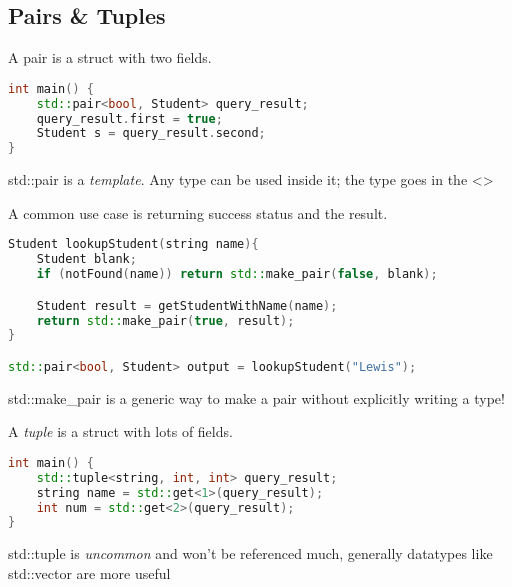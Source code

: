\documentclass[]{article}
\begin{document}
\subsection{Pairs \& Tuples}

\begin{definition}
    A pair is a struct with two fields.
\end{definition}

\begin{lstlisting}[language=C++]
int main() {
    std::pair<bool, Student> query_result;
    query_result.first = true;
    Student s = query_result.second;
}    
\end{lstlisting}

\begin{note}
    std::pair is a \emph{template}. Any type can be used inside it; the type goes in the \textless\textgreater
\end{note}

A common use case is returning success status and the result.
\begin{lstlisting}[language=C++]
Student lookupStudent(string name){
    Student blank;
    if (notFound(name)) return std::make_pair(false, blank);

    Student result = getStudentWithName(name);
    return std::make_pair(true, result);
}

std::pair<bool, Student> output = lookupStudent("Lewis");
\end{lstlisting}

\begin{note}
    std::make\_pair is a generic way to make a pair without explicitly writing a type!
\end{note}

\begin{definition}
    A \emph{tuple} is a struct with lots of fields.
\end{definition}

\begin{lstlisting}[language=C++]
int main() {
    std::tuple<string, int, int> query_result;
    string name = std::get<1>(query_result);
    int num = std::get<2>(query_result);
}
\end{lstlisting}

\begin{danger}
std::tuple is \emph{uncommon} and won't be referenced much, generally datatypes like std::vector are more useful
\end{danger}
\end{document}
